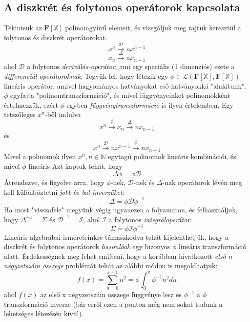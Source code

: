 \documentclass[14p]{article}
\begin{document}
\subsection{A diszkrét és folytonos operátorok kapcsolata}
Tekintsük az $\mathbf{F}[\mathbb{X}]$ polinomgyűrű elemeit, és vizsgáljuk meg rajtuk keresztül a folytonos és diszkrét operátorokat.
\[
	x^n \xrightarrow{\mathcal{D}} nx^{n-1}
\]
\[
	x_n \xrightarrow{\Delta} nx_{n-1}
\]
ahol $\mathcal{D}$ a folytonos \emph{deriválás-operátor}, ami egy speciális (1 dimenziós) esete a \emph{differenciál-operátoroknak}. Tegyük fel, hogy létezik egy $\phi \in \mathscr{L}(\mathbf{F}[\mathbb{X}],\mathbf{F}[\mathbb{X}])$ lineáris operátor, amivel hagyományos hatványokat eső-hatványokká "alakítunk". $\phi$ egyfajta "polinomtranszformáció", és
 mivel függvényeinket polinomokként értelmezzük, ezért $\phi$ egyben \emph{függvénytranszformáció} is ilyen értelemben. Egy tetszőleges $x^n$-ből indulva
\[
	x^n \xrightarrow{\phi} x_n \xrightarrow{\Delta} nx_{n-1}
\]
és
\[
	x^n \xrightarrow{\mathcal{D}} nx^{n-1} \xrightarrow{\phi} nx_{n-1}
\]
Mivel a polinomok ilyen $x^n, n \in \mathbb{N}$ egytagú polinomok lineáris kombinációi, és mivel $\phi$ lineáris\footnotemark{} Azt kaptuk tehát, hogy
\[
	\Delta \phi = \phi \mathcal{D}
\]
Átrendezve, és figyelve arra, hogy $\phi$-nek, $\mathcal{D}$-nek és $\Delta$-nak operátorok lévén meg kell különböztetni \emph{jobb} és \emph{bal inverzüket}:
\[
	\Delta = \phi \mathcal{D} \phi^{-1}
\]
Ha most "visszafele" megyünk végig ugyanezen a folyamaton, és felhasználjuk, hogy $\Delta^{-1} = \Sigma$ és $\mathcal{D}^{-1} = \mathcal{I}$, ahol $\mathcal{I}$ a folytonos \emph{integráloperátor}:
\[
	\Sigma = \phi\mathcal{I}\phi^{-1}
\]
Lineáris algebrábai ismereteinkre támaszkodva tehát kijelenthetjük, hogy a diszkrét és folytonos operátorok \emph{hasonlóak} egy bizonyos $\phi$ lineáris transzformáció alatt.
Érdekességnek meg lehet említeni, hogy a korábban hivatkozott \emph{első n négyzetszám összege} problémát tehát az alábbi módon is megoldhatjuk:
\[
	f(x) = \sum_{n=0}^{x-1}n^2 = \phi \int_0^x\phi^{-1}n^2 dn
\]
ahol $f(x)$ az első x négyzetszám összege függvénye lesz és $\phi^{-1}$ a $\phi$ transzformáció inverze (bár erről ezen a ponton még nem sokat tudunk a lehetséges létezésén kívül).
\end{document}
